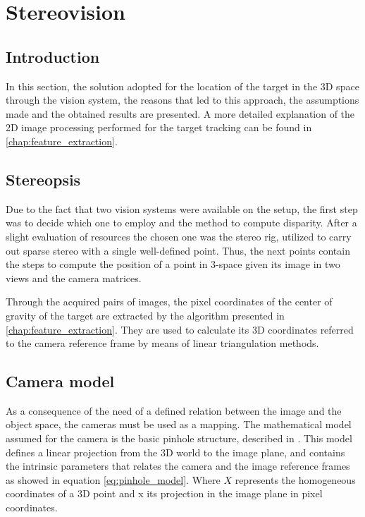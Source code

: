 
\chapter{Stereovision} %
\label{chap:stereopsis}

\section{Introduction}
In this section, the solution adopted for the location of the target in the 3D space through the vision system, the reasons that led to this approach, the assumptions made and the obtained results are presented.
A more detailed explanation of the 2D image processing performed for the target tracking can be found in \ref{chap:feature_extraction}.

\section{Stereopsis}
Due to the fact that two vision systems were available on the setup, the first step was to decide which one to employ and the method to compute disparity.
After a slight evaluation of resources the chosen one was the stereo rig, utilized to carry out sparse stereo with a single well-defined point.
Thus, the next points contain the steps to compute the position of a point in 3-space given its image in two views and the camera matrices.

Through the acquired pairs of images, the pixel coordinates of the center of gravity of the target are extracted by the algorithm presented in \ref{chap:feature_extraction}.
They are used to calculate its 3D coordinates referred to the camera reference frame by means of linear triangulation methods.

\section{Camera model}
As a consequence of the need of a defined relation between the image and the object space, the cameras must be used as a mapping.
The mathematical model assumed for the camera is the basic pinhole structure, described in \cite{Hartley}.
This model defines a linear projection from the 3D world to the image plane, and contains the intrinsic parameters that relates the camera and the image reference frames as showed in equation \eqref{eq:pinhole_model}. Where $X$ represents the homogeneous coordinates of a 3D point and x its projection in the image plane in pixel coordinates.


